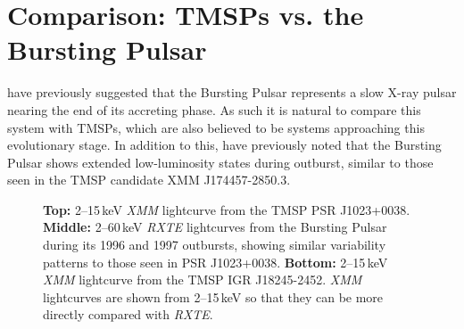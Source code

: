 \section{Comparison: TMSPs vs. the Bursting Pulsar}

\par \citealp{Rappaport_BPHistory} have previously suggested that the Bursting Pulsar represents a slow X-ray pulsar nearing the end of its accreting phase. As such it is natural to compare this system with TMSPs, which are also believed to be systems approaching this evolutionary stage. In addition to this, \citealp{Degenaar_174457} have previously noted that the Bursting Pulsar shows extended low-luminosity states during outburst, similar to those seen in the TMSP candidate XMM J174457-2850.3.

\begin{figure}
 \centering
 \caption[Lightcurves from the Bursting Pulsar and from two TMSPs, showing similar patterns of variability.]{\textbf{Top:} 2--15\,keV \indexxmm\textit{XMM} lightcurve from the TMSP PSR J1023+0038. \textbf{Middle:} 2--60\,keV \indexrxte\textit{RXTE} lightcurves from the Bursting Pulsar during its 1996 and 1997 outbursts, showing similar variability patterns to those seen in PSR J1023+0038. \textbf{Bottom:} 2--15\,keV \textit{XMM} lightcurve from the TMSP IGR J18245-2452. \textit{XMM} lightcurves are shown from 2--15\,keV so that they can be more directly compared with \textit{RXTE}.}
 \label{fig:lcs}
\end{figure}

